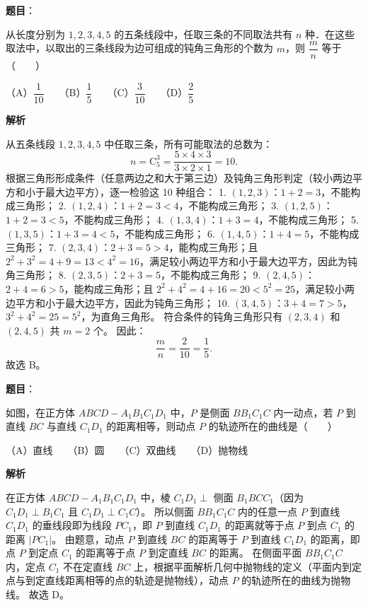 \begin{answer}

\textbf{题目}：

从长度分别为 $1, 2, 3, 4, 5$ 的五条线段中，任取三条的不同取法共有 $n$ 种．在这些取法中，以取出的三条线段为边可组成的钝角三角形的个数为 $m$，则 $\dfrac{m}{n}$ 等于\mbox{（　　）}

（A）$\dfrac{1}{10}$　　（B）$\dfrac{1}{5}$　　（C）$\dfrac{3}{10}$　　（D）$\dfrac{2}{5}$

\textbf{解析}

从五条线段 $1, 2, 3, 4, 5$ 中任取三条，所有可能取法的总数为：
\nopagebreak[4]
\[
n=\mathrm{C}_5^3=\frac{5\times 4\times 3}{3\times 2\times 1}=10.
\]
根据三角形形成条件（任意两边之和大于第三边）及钝角三角形判定（较小两边平方和小于最大边平方），逐一检验这 10 种组合：
1. $(1,2,3)$：$1+2=3$，不能构成三角形；
2. $(1,2,4)$：$1+2=3<4$，不能构成三角形；
3. $(1,2,5)$：$1+2=3<5$，不能构成三角形；
4. $(1,3,4)$：$1+3=4$，不能构成三角形；
5. $(1,3,5)$：$1+3=4<5$，不能构成三角形；
6. $(1,4,5)$：$1+4=5$，不能构成三角形；
7. $(2,3,4)$：$2+3=5>4$，能构成三角形；且 $2^2+3^2=4+9=13<4^2=16$，满足较小两边平方和小于最大边平方，因此为钝角三角形；
8. $(2,3,5)$：$2+3=5$，不能构成三角形；
9. $(2,4,5)$：$2+4=6>5$，能构成三角形；且 $2^2+4^2=4+16=20<5^2=25$，满足较小两边平方和小于最大边平方，因此为钝角三角形；
10. $(3,4,5)$：$3+4=7>5$，$3^2+4^2=25=5^2$，为直角三角形。
符合条件的钝角三角形只有 $(2,3,4)$ 和 $(2,4,5)$ 共 $m=2$ 个。
因此：
\nopagebreak[4]
\[
\frac{m}{n}=\frac{2}{10}=\frac{1}{5}.
\]
故选 B。


\end{answer}
\begin{answer}

\textbf{题目}：

如图，在正方体 $ABCD-A_1B_1C_1D_1$ 中，$P$ 是侧面 $BB_1C_1C$ 内一动点，若 $P$ 到直线 $BC$ 与直线 $C_1D_1$ 的距离相等，则动点 $P$ 的轨迹所在的曲线是\mbox{（　　）}
\nopagebreak[4]
\begin{center}\end{center}
\nopagebreak[4]
（A）直线　　（B）圆　　（C）双曲线　　（D）抛物线

\textbf{解析}

在正方体 $ABCD-A_1B_1C_1D_1$ 中，棱 $C_1D_1\perp$ 侧面 $B_1BCC_1$（因为 $C_1D_1\perp B_1C_1$ 且 $C_1D_1\perp C_1C$）。
所以侧面 $BB_1C_1C$ 内的任意一点 $P$ 到直线 $C_1D_1$ 的垂线段即为线段 $PC_1$，即 $P$ 到直线 $C_1D_1$ 的距离就等于点 $P$ 到点 $C_1$ 的距离 $|PC_1|$。
由题意，动点 $P$ 到直线 $BC$ 的距离等于 $P$ 到直线 $C_1D_1$ 的距离，即点 $P$ 到定点 $C_1$ 的距离等于点 $P$ 到定直线 $BC$ 的距离。
在侧面平面 $BB_1C_1C$ 内，定点 $C_1$ 不在定直线 $BC$ 上，根据平面解析几何中抛物线的定义（平面内到定点与到定直线距离相等的点的轨迹是抛物线），动点 $P$ 的轨迹所在的曲线为抛物线。
故选 D。


\end{answer}

